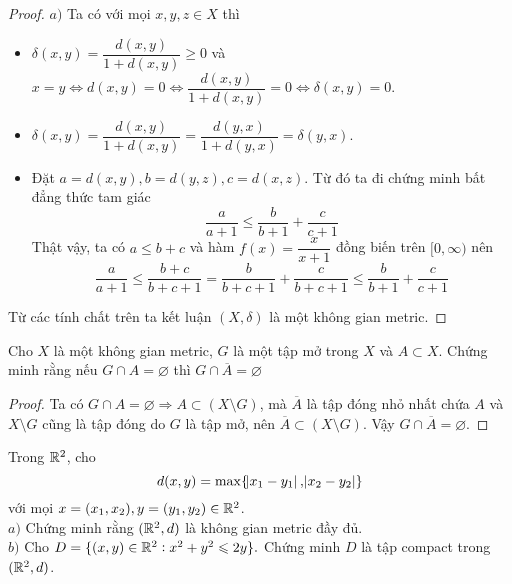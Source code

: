 \begin{proof}
$a)$ Ta có với mọi $x, y, z \in X$ thì
\begin{itemize}
    \item $\delta(x,y) = \dfrac{d(x,y)}{1+d(x,y)} \geq 0$ và $x = y \Leftrightarrow d(x,y) = 0 \Leftrightarrow \dfrac{d(x,y)}{1+d(x,y)} = 0 \Leftrightarrow \delta(x,y) = 0$.
    \item $\delta(x,y) = \dfrac{d(x,y)}{1+d(x,y)} = \dfrac{d(y,x)}{1+d(y,x)} = \delta(y,x)$.
    \item Đặt $a = d(x,y), b = d(y,z), c = d(x, z)$. Từ đó ta đi chứng minh bất đẳng thức tam giác
    $$
        \dfrac{a}{a+1} \leq \dfrac{b}{b+1} + \dfrac{c}{c+1}
    $$
    Thật vậy, ta có $a \leq b + c$ và hàm $f(x) = \dfrac{x}{x+1}$ đồng biến trên $[0,\infty)$ nên
    $$
        \frac{a}{a+1} \leq \frac{b+c}{b+c+1} = \frac{b}{b+c+1} + \frac{c}{b+c+1} \leq \frac{b}{b+1} + \frac{c}{c+1}
    $$
\end{itemize}
Từ các tính chất trên ta kết luận $(X,\delta)$ là một không gian metric.
\end{proof}

\begin{exercise}{19}
    Cho $X$ là một không gian metric, $G$ là một tập mở trong $X$ và $A \subset X$. Chứng minh rằng nếu $G \cap A = \varnothing$ thì $G \cap \overline{A} = \varnothing$
\end{exercise}

\begin{proof}
Ta có $G \cap A = \varnothing \Rightarrow A \subset (X \setminus G)$, mà $\overline{A}$ là tập đóng nhỏ nhất chứa $A$ và $X \setminus G$ cũng là tập đóng do $G$ là tập mở, nên $\overline{A} \subset (X \setminus G)$. Vậy $G \cap \overline{A} = \varnothing$.
\end{proof}

\begin{exercise}{22}
    Trong $\mathbb R^2$, cho
    $$
        d(x,y) = \max\{\abs{x_1-y_1}, \abs{x_2-y_2}\}
    $$
    với mọi $x = (x_1,x_2), y = (y_1,y_2) \in \mathbb R^2$.\\[3mm]
    $a)$ Chứng minh rằng $(\mathbb R^2,d)$ là không gian metric đầy đủ.\\
    $b)$ Cho $D = \{(x,y) \in \mathbb R^2: x^2 + y^2 \leqslant 2y\}.$ Chứng minh $D$ là tập compact trong $(\mathbb R^2,d)$.
\end{exercise}

